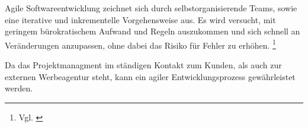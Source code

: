 Agile Softwareentwicklung zeichnet sich durch selbstorganisierende Teams, sowie eine iterative
und inkrementelle Vorgehensweise aus. Es wird versucht, mit geringem
bürokratischem Aufwand und Regeln auszukommen und sich schnell an Veränderungen anzupassen,
ohne dabei das Risiko für Fehler zu erhöhen. \footnote{Vgl. \cite{wiki:Agile_Softwareentwicklung}}


Da das Projektmanagment im ständigen Kontakt zum Kunden, als auch zur externen
Werbeagentur steht, kann ein agiler Entwicklungsprozess gewährleistet werden.
